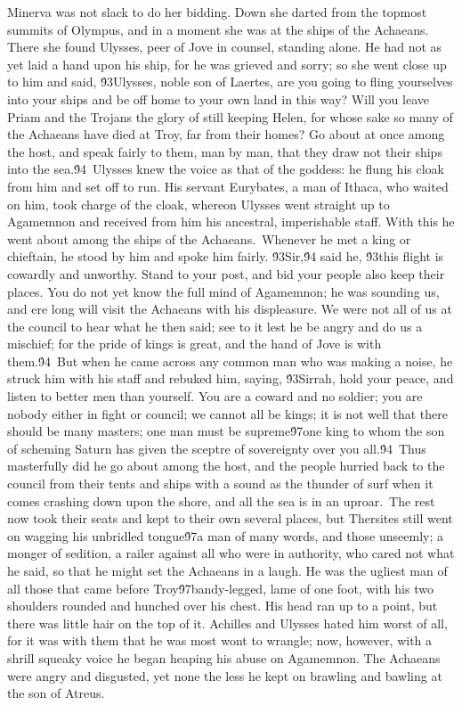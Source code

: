 {Minerva was not slack to do her bidding. Down she darted from the topmost summits of Olympus, and in a moment she was at the ships of the Achaeans. There she found Ulysses, peer of Jove in counsel, standing alone. He had not as yet laid a hand upon his ship, for he was grieved and sorry; so she went close up to him and said, \'93Ulysses, noble son of Laertes, are you going to fling yourselves into your ships and be off home to your own land in this way? Will you leave Priam and the Trojans the glory of still keeping Helen, for whose sake so many of the Achaeans have died at Troy, far from their homes? Go about at once among the host, and speak fairly to them, man by man, that they draw not their ships into the sea.\'94\
Ulysses knew the voice as that of the goddess: he flung his cloak from him and set off to run. His servant Eurybates, a man of Ithaca, who waited on him, took charge of the cloak, whereon Ulysses went straight up to Agamemnon and received from him his ancestral, imperishable staff. With this he went about among the ships of the Achaeans.\
Whenever he met a king or chieftain, he stood by him and spoke him fairly. \'93Sir,\'94 said he, \'93this flight is cowardly and unworthy. Stand to your post, and bid your people also keep their places. You do not yet know the full mind of Agamemnon; he was sounding us, and ere long will visit the Achaeans with his displeasure. We were not all of us at the council to hear what he then said; see to it lest he be angry and do us a mischief; for the pride of kings is great, and the hand of Jove is with them.\'94\
But when he came across any common man who was making a noise, he struck him with his staff and rebuked him, saying, \'93Sirrah, hold your peace, and listen to better men than yourself. You are a coward and no soldier; you are nobody either in fight or council; we cannot all be kings; it is not well that there should be many masters; one man must be supreme\'97one king to whom the son of scheming Saturn has given the sceptre of sovereignty over you all.\'94\
Thus masterfully did he go about among the host, and the people hurried back to the council from their tents and ships with a sound as the thunder of surf when it comes crashing down upon the shore, and all the sea is in an uproar.\
The rest now took their seats and kept to their own several places, but Thersites still went on wagging his unbridled tongue\'97a man of many words, and those unseemly; a monger of sedition, a railer against all who were in authority, who cared not what he said, so that he might set the Achaeans in a laugh. He was the ugliest man of all those that came before Troy\'97bandy-legged, lame of one foot, with his two shoulders rounded and hunched over his chest. His head ran up to a point, but there was little hair on the top of it. Achilles and Ulysses hated him worst of all, for it was with them that he was most wont to wrangle; now, however, with a shrill squeaky voice he began heaping his abuse on Agamemnon. The Achaeans were angry and disgusted, yet none the less he kept on brawling and bawling at the son of Atreus.\
}
